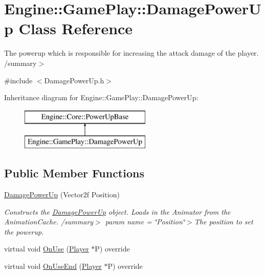 \hypertarget{class_engine_1_1_game_play_1_1_damage_power_up}{}\section{Engine\+:\+:Game\+Play\+:\+:Damage\+Power\+Up Class Reference}
\label{class_engine_1_1_game_play_1_1_damage_power_up}


The powerup which is responsible for increasing the attack damage of the player. /summary$>$  




{\ttfamily \#include $<$Damage\+Power\+Up.\+h$>$}

Inheritance diagram for Engine\+:\+:Game\+Play\+:\+:Damage\+Power\+Up\+:\begin{figure}[H]
\begin{center}
\leavevmode
\includegraphics[height=2.000000cm]{class_engine_1_1_game_play_1_1_damage_power_up}
\end{center}
\end{figure}
\subsection*{Public Member Functions}
\begin{DoxyCompactItemize}
\item 
\hyperlink{class_engine_1_1_game_play_1_1_damage_power_up_a25af42480a9ce9eedbb82e1be666891c}{Damage\+Power\+Up} (Vector2f Position)
\begin{DoxyCompactList}\small\item\em Constructs the \hyperlink{class_engine_1_1_game_play_1_1_damage_power_up}{Damage\+Power\+Up} object. Loads in the Animator from the Animation\+Cache. /summary$>$ param name = \char`\"{}\+Position\char`\"{}$>$The position to set the powerup.\end{DoxyCompactList}\item 
virtual void \hyperlink{class_engine_1_1_game_play_1_1_damage_power_up_abadfb61b67dd580bc98d7e120c2809cd}{On\+Use} (\hyperlink{class_engine_1_1_game_play_1_1_player}{Player} $\ast$P) override
\item 
virtual void \hyperlink{class_engine_1_1_game_play_1_1_damage_power_up_a97bdd448602470ff4305b39eee866fd2}{On\+Use\+End} (\hyperlink{class_engine_1_1_game_play_1_1_player}{Player} $\ast$P) override
\end{DoxyCompactItemize}
